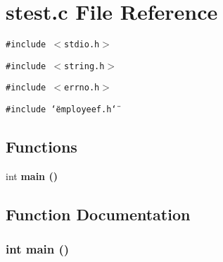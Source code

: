 \section{stest.c File Reference}
\label{stest_8c}
{\tt \#include $<$stdio.h$>$}\par
{\tt \#include $<$string.h$>$}\par
{\tt \#include $<$errno.h$>$}\par
{\tt \#include \char`\"{}employeef.h\char`\"{}}\par
\subsection*{Functions}
\begin{CompactItemize}
\item 
int \bf{main} ()
\end{CompactItemize}


\subsection{Function Documentation}
\subsubsection{\setlength{\rightskip}{0pt plus 5cm}int main ()}\label{stest_8c_446c6b9a1a4dbab517fbb760870458a3}


